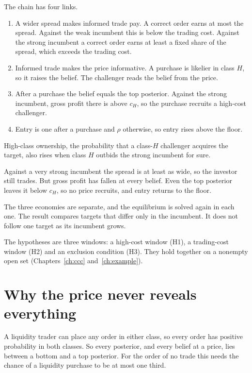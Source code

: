 The chain has four links.
\begin{enumerate}[nosep]
\item A wider spread makes informed trade pay. A correct order earns at most the spread. Against the weak incumbent
this is below the trading cost. Against the strong incumbent a correct order earns at least a fixed share of the
spread, which exceeds the trading cost.
\item Informed trade makes the price informative. A purchase is likelier in class \(H\), so it raises the belief.
The challenger reads the belief from the price.
\item After a purchase the belief equals the top posterior. Against the strong incumbent, gross profit there is above
\(c_H\), so the purchase recruits a high-cost challenger.
\item Entry is one after a purchase and \(\rho\) otherwise, so entry rises above the floor.
\end{enumerate}
High-class ownership, the probability that a class-\(H\) challenger acquires the target, also rises when class \(H\) outbids the strong incumbent for sure.

Against a very strong incumbent the spread is at least as wide, so the investor still trades. But gross profit has
fallen at every belief. Even the top posterior leaves it below \(c_H\), so no price recruits, and entry returns to
the floor.

\begin{watchout}
The three economies are separate, and the equilibrium is solved again in each one. The result compares targets that
differ only in the incumbent. It does not follow one target as its incumbent grows.
\end{watchout}

The hypotheses are three windows: a high-cost window (H1), a trading-cost window (H2) and an exclusion condition
(H3). They hold together on a nonempty open set (Chapters~\ref{ch:ccc} and~\ref{ch:example}).

\section{Why the price never reveals everything}\label{sec:story-noise}

A liquidity trader can place any order in either class, so every order has positive probability in both classes.
So every posterior, and every belief at a price, lies between a bottom
and a top posterior. For the order of no trade this needs the chance of a liquidity purchase to be at most one
third.


